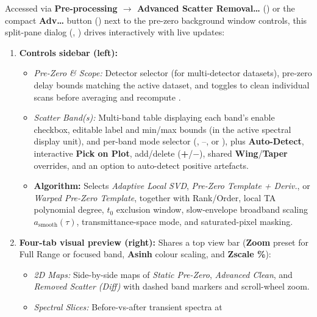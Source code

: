 Accessed via \textbf{Pre-processing $\to$ Advanced Scatter Removal\ldots}
() or the compact \textbf{Adv\ldots} button
() next to the pre-zero background window controls,
this split-pane dialog (, )
drives  interactively with live updates:
\begin{enumerate}
  \item \textbf{Controls sidebar (left):}
        \begin{itemize}
          \item \emph{Pre-Zero \& Scope:} Detector selector (for multi-detector
                datasets), pre-zero delay bounds matching the active dataset,
                and toggles to clean individual scans before averaging and
                recompute .
          \item \emph{Scatter Band(s):} Multi-band table displaying each band's
                enable checkbox, editable label and min/max bounds (in the
                active spectral display unit), and per-band mode selector
                (, --, or ),
                plus \textbf{Auto-Detect}, interactive \textbf{Pick on Plot},
                add/delete (\textbf{+}/\textbf{$-$}), shared \textbf{Wing}/\textbf{Taper}
                overrides, and an option to auto-detect positive artefacts.
          \item \textbf{Algorithm:} Selects \emph{Adaptive Local SVD},
                \emph{Pre-Zero Template + Deriv.}, or \emph{Warped Pre-Zero
                Template}, together with Rank/Order, local TA polynomial degree,
                $t_0$ exclusion window, slow-envelope broadband scaling
                $a_{\mathrm{smooth}}(\tau)$, transmittance-space mode, and
                saturated-pixel masking.
        \end{itemize}
  \item \textbf{Four-tab visual preview (right):} Shares a top view bar
        (\textbf{Zoom} preset for Full Range or focused band, \textbf{Asinh}
        colour scaling, and \textbf{Zscale \%}):
        \begin{itemize}
          \item \emph{2D Maps:} Side-by-side maps of \emph{Static Pre-Zero},
                \emph{Advanced Clean}, and \emph{Removed Scatter (Diff)}
                with dashed band markers and scroll-wheel zoom.
          \item \emph{Spectral Slices:} Before-vs-after transient spectra at

\end{itemize}
\end{enumerate}
